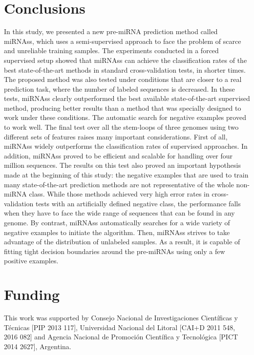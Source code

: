 \documentclass{article}
\begin{document}
\section{Conclusions} \label{sec:conclusions}
In this study, we presented a new pre-miRNA prediction method called miRNAss, which uses a semi-supervised approach to face the problem of scarce and unreliable training samples. The experiments conducted in a forced supervised setup showed that miRNAss can achieve the classification rates of the best state-of-the-art methods in standard cross-validation tests, in shorter times. The proposed method was also tested under conditions that are closer to a real prediction task, where the number of labeled sequences is decreased. In these tests, miRNAss clearly outperformed the best available state-of-the-art supervised method, producing better results than a method that was specially designed to work under these conditions. The automatic search for negative examples proved to work well.
The final test over all the stem-loops of three genomes using two different sets of features raises many important considerations. First of all, miRNAss widely outperforms the classification rates of supervised approaches. In addition, miRNAss proved to be efficient and scalable for handling over four million sequences. The results on this test also proved an important hypothesis made at the beginning of this study: the negative examples that are used to train many state-of-the-art prediction methods are not representative of the whole non-miRNA class. While those methods achieved very high error rates in cross-validation tests with an artificially defined negative class, the performance falls when they have to face the wide range of sequences that can be found in any genome. By contrast, miRNAss automatically searches for a wide variety of negative examples to initiate the algorithm. Then, miRNAss strives to take advantage of the distribution of unlabeled samples. As a result, it is capable of fitting tight decision boundaries around the pre-miRNAs using only a few positive examples.

\section*{Funding}
This work was supported by Consejo Nacional de Investigaciones Cient\'ificas y T\'ecnicas [PIP 2013 117], Universidad Nacional del Litoral [CAI+D 2011 548, 2016 082] and Agencia Nacional de Promoci\'on Cient\'ifica y Tecnol\'ogica [PICT 2014 2627], Argentina.




\end{document}
